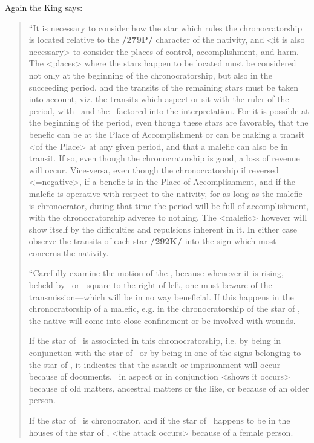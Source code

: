 Again the King says:
\begin{quote}
“It is necessary to consider how the star which rules the chronocratorship is located relative to the \textbf{/279P/} character of the nativity, and <it is also necessary> to consider the places of control, accomplishment, and harm. The <places> where the stars happen to be located must be considered not only at the beginning of the chronocratorship, but also in the succeeding period, and the transits of the remaining stars must be taken into account, viz. the transits which aspect or sit with the ruler of the period, with \Mercury\, and the \Moon\, factored into the interpretation. For it is possible at the beginning of the period, even though these stars are favorable, that the benefic can be at the Place of Accomplishment or can be making a transit <of the Place> at any given period, and that a malefic
can also be in transit. If so, even though the chronocratorship is good, a loss of revenue will occur. Vice-versa, even though the chronocratorship if reversed <=negative>, if a benefic is in the Place of Accomplishment, and if the malefic is operative with respect to the nativity, for as long as the malefic is chronocrator, during that time the period will be full of accomplishment, with the chronocratorship adverse to nothing. The <malefic> however will show itself by the difficulties and repulsions inherent in it. In either case observe the transits of each star \textbf{/292K/} into the sign which most concerns the nativity.

“Carefully examine the motion of the \Moon, because whenever it is rising, beheld by \Mars\, or \Saturn\, square to the right of left, one must beware of the transmission—which will be in no way beneficial. If this happens in the chronocratorship of a malefic, e.g. in the chronocratorship of the star of \Mars, the native will come into close confinement or be involved with wounds. 

If the star of \Mercury\, is associated in this chronocratorship, i.e. by being in conjunction with the star of \Mars\, or by being in one of the signs belonging to the star of \Mars, it indicates that the assault or imprisonment will occur because of documents. \Saturn\, in aspect or in conjunction <shows it occurs> because of old matters, ancestral matters or the like, or because of an older person. 

If the star of \Venus\, is chronocrator, and if the star of \Mars\, happens to be in the houses of the star of \Venus, <the attack occurs> because of a female person. 


\end{quote}
